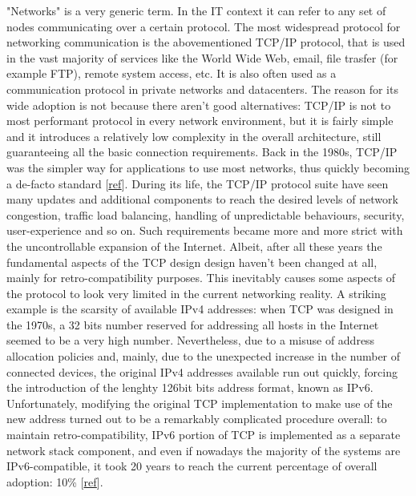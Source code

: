 "Networks" is a very generic term. In the IT context it can refer to any set of nodes communicating over a certain protocol. The most widespread protocol for networking communication is the abovementioned TCP/IP protocol, that is used in the vast majority of services like the World Wide Web, email, file trasfer (for example FTP), remote system access, etc. It is also often used as a communication protocol in private networks and datacenters. 
The reason for its wide adoption is not because there aren't good alternatives: TCP/IP is not to most performant protocol in every network environment, but it is fairly simple and it introduces a relatively low complexity in the overall architecture, still guaranteeing all the basic connection requirements. Back in the 1980s, TCP/IP was the simpler way for applications to use most networks, thus quickly becoming a de-facto standard [\href{http://www.computerworld.com/article/2593612/networking/tcp-ip.html}{ref}]. 
During its life, the TCP/IP protocol suite have seen many updates and additional components to reach the desired levels of network congestion, traffic load balancing, handling of unpredictable behaviours, security, user-experience and so on. Such requirements became more and more strict with the uncontrollable expansion of the Internet. Albeit, after all these years the fundamental aspects of the TCP design design haven't been changed at all, mainly for retro-compatibility purposes. This inevitably causes some aspects of the protocol to look very limited in the current networking reality. A striking example is the scarsity of available IPv4 addresses: when TCP was designed in the 1970s, a 32 bits number reserved for addressing all hosts in the Internet seemed to be a very high number. Nevertheless, due to a misuse of address allocation policies and, mainly, due to the unexpected increase in the number of connected devices, the original IPv4 addresses available run out quickly, forcing the introduction of the lenghty 126bit bits address format, known as IPv6. Unfortunately, modifying the original TCP implementation to make use of the new address turned out to be a remarkably complicated procedure overall: to maintain retro-compatibility, IPv6 portion of TCP is implemented as a separate network stack component, and even if nowadays the majority of the systems are IPv6-compatible, it took 20 years to reach the current percentage of overall adoption: 10\% [\href{http://www.google.com/intl/en/ipv6/statistics.html#tab=ipv6-adoption&tab=ipv6-adoption}{ref}].

